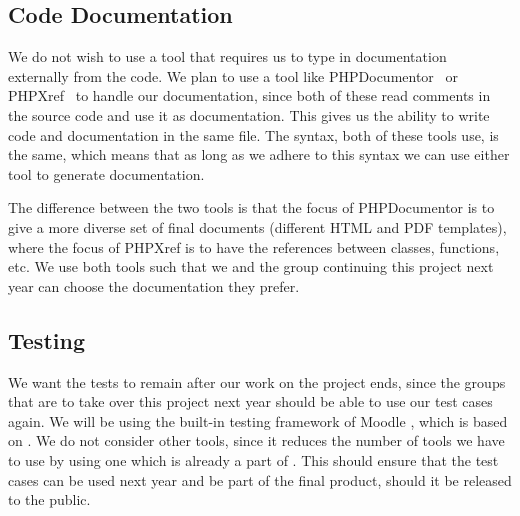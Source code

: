 \subsection{Code Documentation}
We do not wish to use a tool that requires us to type in documentation externally from the code.
We plan to use a tool like PHPDocumentor~\cite{phpdocumentor} or PHPXref~\cite{phpxref} to handle our documentation, since both of these read comments in the source code and use it as documentation.
This gives us the ability to write code and documentation in the same file.
The syntax, both of these tools use, is the same, which means that as long as we adhere to this syntax we can use either tool to generate documentation.

The difference between the two tools is that the focus of PHPDocumentor is to give a more diverse set of final documents (different HTML and PDF templates), where the focus of PHPXref is to have the references between classes, functions, etc.
We use both tools such that we and the group continuing this project next year can choose the documentation they prefer.


\subsection{Testing}
\label{sub:testing}
We want the tests to remain after our work on the project ends, since the groups that are to take over this project next year should be able to use our test cases again.
We will be using the built-in testing framework of Moodle \cite{moodletest}, which is based on \simpletest{} \cite{simpletest}.
We do not consider other tools, since it reduces the number of tools we have to use by using one which is already a part of \moodle{}.
This should ensure that the test cases can be used next year and be part of the final product, should it be released to the public.